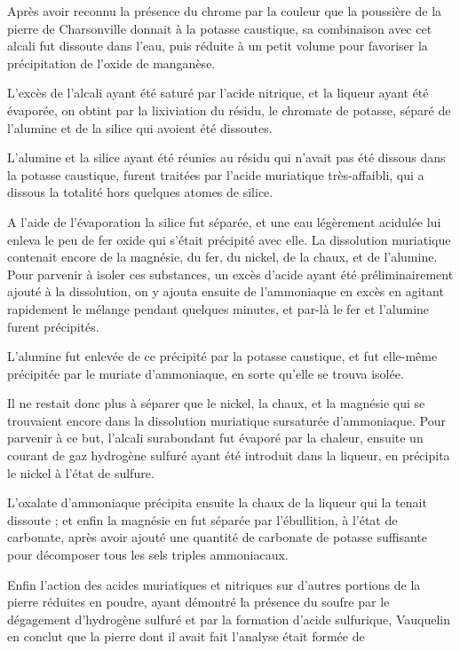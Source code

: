 \documentclass[a4paper, 12pt, oneside, french]{article}
\begin{document}
Après avoir reconnu la présence du chrome par la couleur que la poussière de la pierre de Charsonville donnait à la potasse caustique, sa combinaison avec cet alcali fut dissoute dans l'eau, puis réduite à un petit volume pour favoriser la précipitation de l'oxide de manganèse.

L'excès de l'alcali ayant été saturé par l'acide nitrique, et la liqueur ayant été évaporée, on obtint par la lixiviation du résidu, le chromate de potasse, séparé de l'alumine et de la silice qui avoient été dissoutes.

L'alumine et la silice ayant été réunies au résidu qui n'avait pas été dissous dans la potasse caustique, furent traitées par l'acide muriatique très-affaibli, qui a dissous la totalité hors quelques atomes de silice.

A l'aide de l'évaporation la silice fut séparée, et une eau légèrement acidulée lui enleva le peu de fer oxide qui s'était précipité avec elle. La dissolution muriatique contenait encore de la magnésie, du fer, du nickel, de la chaux, et de l'alumine. Pour parvenir à isoler ces substances, un excès d'acide ayant été préliminairement ajouté à la dissolution, on y ajouta ensuite de l'ammoniaque en excès en agitant rapidement le mélange pendant quelques minutes, et par-là le fer et l'alumine furent précipités.

L'alumine fut enlevée de ce précipité par la potasse caustique, et fut elle-même précipitée par le muriate d'ammoniaque, en sorte qu'elle se trouva isolée.

Il ne restait donc plus à séparer que le nickel, la chaux, et la magnésie qui se trouvaient encore dans la dissolution muriatique sursaturée d'ammoniaque. Pour parvenir à ce but, l'alcali surabondant fut évaporé par la chaleur, ensuite un courant de gaz hydrogène sulfuré ayant été introduit dans la liqueur, en précipita le nickel à l'état de sulfure.

L'oxalate d'ammoniaque précipita ensuite la chaux de la liqueur qui la tenait dissoute ; et enfin la magnésie en fut séparée par l'ébullition, à l'état de carbonate, après avoir ajouté une quantité de carbonate de potasse suffisante pour décomposer tous les sels triples ammoniacaux.

Enfin l'action des acides muriatiques et nitriques sur d'autres portions de la pierre réduites en poudre, ayant démontré la présence du soufre par le dégagement d'hydrogène sulfuré et par la formation d'acide sulfurique, Vauquelin en conclut que la pierre dont il avait fait l'analyse était formée de
\end{document}
